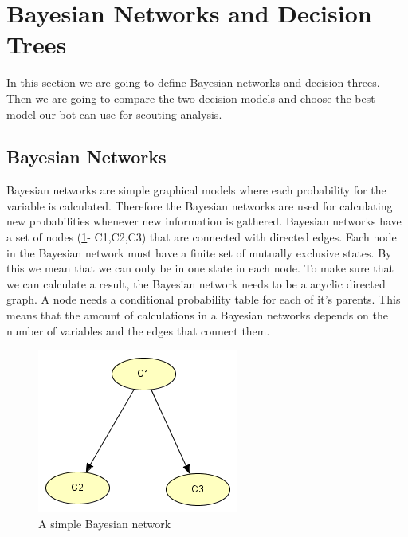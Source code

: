 \section{Bayesian Networks and Decision Trees}
In this section we are going to define Bayesian networks and decision threes. Then we are going to compare the two decision models and choose the best model our bot can use for scouting analysis.

\subsection{Bayesian Networks}
	Bayesian networks are simple graphical models where each probability for the variable is calculated. Therefore the Bayesian networks are used for calculating new probabilities whenever new information is gathered. Bayesian networks have a  set of nodes (\ref{fig:basicbayesian}- C1,C2,C3) that are connected with directed edges. Each node in the Bayesian network must have a finite set of mutually exclusive states. By this we mean that we can only be in one state in each node. To make sure that we can calculate a result, the Bayesian network needs to be a acyclic directed graph. A node needs a conditional probability table for each of it's parents. This means that the amount of calculations in a Bayesian networks depends on the number of variables and the edges that connect them.
	
\begin{figure}[H]
\includegraphics{Figures/BayesianPictures/BasicBayesianNetwork.png}
\caption{A simple Bayesian network}
\label{fig:basicbayesian}
\end{figure}


